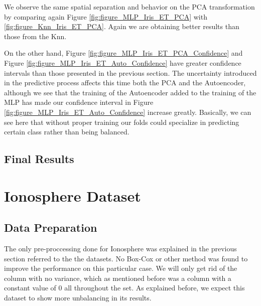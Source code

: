 We observe the same spatial separation and behavior on the PCA transformation by comparing again Figure \ref{fig:figure_MLP_Iris_ET_PCA} with \ref{fig:figure_Knn_Iris_ET_PCA}. Again we are obtaining better results than those from the Knn. \par

On the other hand, Figure \ref{fig:figure_MLP_Iris_ET_PCA_Confidence} and Figure \ref{fig:figure_MLP_Iris_ET_Auto_Confidence} have greater confidence intervals than those presented in the previous section. The uncertainty introduced in the predictive process affects this time both the PCA and the Autoencoder, although we see that the training of the Autoencoder added to the training of the MLP has made our confidence interval in Figure \ref{fig:figure_MLP_Iris_ET_Auto_Confidence} increase greatly. Basically, we can see here that without proper training our folds could specialize in predicting certain class rather than being balanced.
 
\subsection{Final Results} 
%	


\section{Ionosphere Dataset}
\subsection{Data Preparation}

The only pre-proccessing done for Ionosphere was explained in the previous section referred to the the datasets. No Box-Cox or other method was found to improve the performance on this particular case. We will only get rid of the column with no variance, which as mentioned before was a column with a constant value of 0 all throughout the set. As explained before, we expect this dataset to show more unbalancing in its results.

